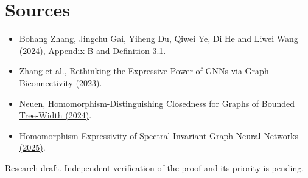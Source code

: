 \documentclass[11pt]{article}
\begin{document}
\section*{Sources}
\begin{itemize}
\item \href{https://arxiv.org/abs/2401.08514}{Bohang Zhang, Jingchu Gai, Yiheng Du, Qiwei Ye, Di He and Liwei Wang (2024), Appendix B and Definition 3.1}.
\item \href{https://arxiv.org/abs/2301.09505}{Zhang et al., Rethinking the Expressive Power of GNNs via Graph Biconnectivity (2023)}.
\item \href{https://arxiv.org/abs/2304.07011}{Neuen, Homomorphism-Distinguishing Closedness for Graphs of Bounded Tree-Width (2024)}.
\item \href{https://arxiv.org/abs/2503.00485}{Homomorphism Expressivity of Spectral Invariant Graph Neural Networks (2025)}.
\end{itemize}
{\small Research draft. Independent verification of the proof and its priority is pending.}
\end{document}
